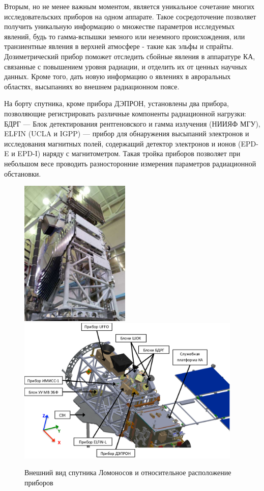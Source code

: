 Вторым, но не менее важным моментом, является уникальное сочетание многих исследовательских приборов на одном аппарате. Такое сосредоточение позволяет получить уникальную информацию о множестве параметров исследуемых явлений, будь то гамма-вспышки земного или неземного происхождения, или транзиентные явления в верхней атмосфере - такие как эльфы и спрайты. Дозиметрический прибор поможет отследить сбойные явления в аппаратуре КА, связанные с повышением уровня радиации, и отделить их от ценных научных данных. Кроме того, дать новую информацию о явлениях в авроральных областях, высыпаниях во внешнем радиационном поясе.

На борту спутника, кроме прибора ДЭПРОН, установлены два прибора, позволяющие регистрировать различные компоненты радиационной нагрузки: БДРГ --- Блок детектирования рентгеновского и гамма излучения (НИИЯФ МГУ), ELFIN (UCLA и IGPP) --- прибор для обнаружения высыпаний электронов и исследования магнитных полей, содержащий детектор электронов и ионов (EPD-E и EPD-I) наряду с магнитометром. Такая тройка приборов позволяет при небольшом весе проводить разносторонние измерения параметров радиационной обстановки.



\begin{figure}
\centering
\includegraphics[height=7cm,keepaspectratio]{images/lomo4}
\includegraphics[height=7cm,keepaspectratio]{images/lomo3}
\caption{Внешний вид спутника Ломоносов и относительное расположение приборов}
\label{fig:lomo3}
\end{figure}


